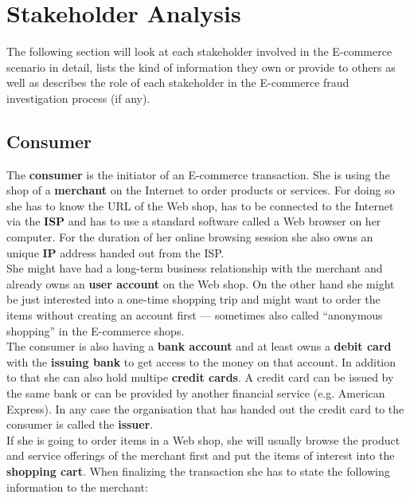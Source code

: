 
\section{Stakeholder Analysis}
\label{sec:stakeholder_analysis}

The following section will look at each stakeholder involved in the E-commerce scenario in detail, lists the kind of information they own or provide to others as well as describes the role of each stakeholder in the E-commerce fraud investigation process (if any).

\subsection{Consumer}
\label{subsec:stakeholder_consumer}

The \textbf{consumer} is the initiator of an E-commerce transaction. She is using the shop of a \textbf{merchant} on the Internet to order products or services. For doing so she has to know the \gls{URL} of the Web shop, has to be connected to the Internet via the \textbf{\gls{ISP}} and has to use a standard software called a Web browser on her computer. For the duration of her online browsing session she also owns an unique \textbf{\gls{IP}} address handed out from the \gls{ISP}.\\

She might have had a long-term business relationship with the merchant and already owns an \textbf{user account} on the Web shop. On the other hand she might be just interested into a one-time shopping trip and might want to order the items without creating an account first --- sometimes also called ``anonymous shopping'' in the E-commerce shops. \\

The consumer is also having a \textbf{bank account} and at least owns a \textbf{debit card} with the \textbf{issuing bank} to get access to the money on that account. In addition to that she can also hold multipe \textbf{credit cards}. A credit card can be issued by the same bank or can be provided by another financial service (e.g. American Express). In any case the organisation that has handed out the credit card to the consumer is called the \textbf{issuer}. \\

If she is going to order items in a Web shop, she will usually browse the product and service offerings of the merchant first and put the items of interest into the \textbf{shopping cart}. When finalizing the transaction she has to state the following information to the merchant:\@

